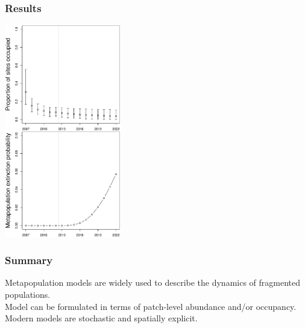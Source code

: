 \documentclass[color=usenames,dvipsnames]{beamer}\usepackage[]{graphicx}\usepackage[]{color}
\begin{document}
\begin{frame}
  \frametitle{Results}
  \begin{center}
    \includegraphics[width=0.38\textwidth]{figs/proj-ext2} \\
  \end{center}
\end{frame}




\begin{frame}
  \frametitle{Summary}
  \large
  Metapopulation models are widely used to describe the
      dynamics of fragmented populations. \\
  \vfill
  Model can be formulated in terms of patch-level abundance
      and/or occupancy. \\
  \vfill
  Modern models are stochastic and spatially explicit.
\end{frame}
\end{document}
